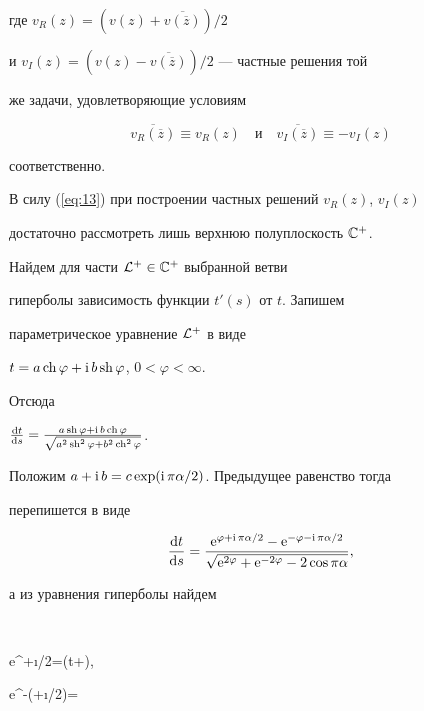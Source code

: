 где $v_R(z)=(v(z)+\overline{v(\overline z)})/2$


и $v_I(z)=(v(z)-\overline{v(\overline z)})/2$ --- частные решения той 


же задачи, удовлетворяющие условиям


\begin{equation} 


\overline{v_R(\overline z)}\equiv v_R(z)


\quad\text{и}\quad\overline{v_I(\overline z)}\equiv-v_I(z)


\label{eq:13}


\end{equation}


соответственно.





В силу (\ref{eq:13}) при построении частных решений $v_R(z)$, $v_I(z)$


достаточно рассмотреть лишь верхнюю полуплоскость ${\Bbb C}^+$.


Найдем для части ${\cal L}^+\in{\Bbb C}^+$ выбранной ветви


гиперболы зависимость функции $t'(s)$ от $t$. Запишем


параметрическое уравнение ${\cal L}^+$ в виде


$t=a\operatorname{ch}\varphi+\mathrm i\, b\operatorname{sh}\varphi$, $0<\varphi<\infty$.


Отсюда


$\frac{\mathrm d t}{\mathrm d s}


=\frac{a\sh\varphi+\i b\ch\varphi}


{\sqrt{a^2\sh^2\varphi+ b^2\ch^2\varphi}}$.


Положим $a+\mathrm i\, b=c\exp(\mathrm i\,\pi\alpha/2)$. Предыдущее равенство тогда


перепишется в виде


$$


\frac{\mathrm d t}{\mathrm d s}=


\frac{\mathrm e^{\varphi+\i\pi\alpha/2}-\mathrm e^{-\varphi-\i\pi\alpha/2}}


{\sqrt{\mathrm e^{2\varphi}+ \mathrm e^{-2\varphi}-2\cos \pi\alpha}},


$$


а из уравнения гиперболы найдем


$$


\mathrm e^{\varphi+\i\pi\alpha/2}=(t+),


\quad \mathrm e^{-(\varphi+\i\pi\alpha/2)}=


